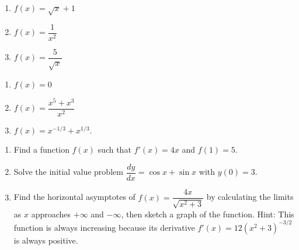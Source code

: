 \documentclass[11pt]{article}
\begin{document}
\begin{multicols}{3}
\begin{enumerate}
\setcounter{enumi}{\theenumCount}
\item $f(x) = \sqrt{x} + 1$
\item $f(x) = \dfrac{1}{x^2}$
\item $f(x) = \dfrac{5}{\sqrt{x}}$
\setcounter{enumCount}{\theenumi}
\end{enumerate}
\end{multicols}
\vfill

\newpage

\begin{multicols}{3}
\begin{enumerate}
\setcounter{enumi}{\theenumCount}
\item $f(x) = 0$
\item $f(x) = \dfrac{x^5 + x^3}{x^2}$
\item $f(x) = x^{-1/3} + x^{1/3}$.
\setcounter{enumCount}{\theenumi}
\end{enumerate}
\end{multicols}
\vfill

\begin{enumerate}
\setcounter{enumi}{\theenumCount}
\item Find a function $f(x)$ such that $f'(x) = 4x$ and $f(1) = 5$. 
\vfill
\item Solve the initial value problem $\dfrac{dy}{dx} = \cos x + \sin x$ with $y(0) = 3$. 
\vfill

\item Find the horizontal asymptotes of $f(x) = \dfrac{4x}{\sqrt{x^2 + 3}}$ by calculating the limits as $x$ approaches $+\infty$ and $-\infty$, then sketch a graph of the function.  Hint: This function is always increasing because its derivative $f'(x) = 12(x^2 + 3)^{-3/2}$ is always positive.  
\vfill
\setcounter{enumCount}{\theenumi}
\end{enumerate}
\end{document}
